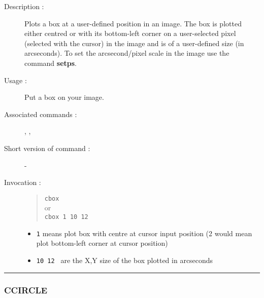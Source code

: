 \begin{description}

\item[Description :] Plots a box at a user-defined position in an image.  The
box is plotted either centred or with its bottom-left corner on a user-selected
pixel (selected with the cursor) in the image and is of a user-defined
size (in arcseconds).  To set the arcsecond/pixel scale in the image
use the command {\bf setps}.

\item[Usage :] Put a box on your image.
\item[Associated commands :] {\tt {}},
{\tt {}}, {\tt {}}
\item[Short version of command :] -
\item[Invocation :]

\begin{quote}{\tt  cbox }\\
or \\
{\tt cbox 1 10 12 }
\end{quote}

\begin{itemize}

\item {\tt 1} means plot box with centre at cursor input position
(2 would mean plot bottom-left corner at cursor position)
\item {\tt 10 12 } are the X,Y size of the box plotted in arcseconds

\end{itemize}

\end{description}

\hrule
\subsubsection*{\label{CCIRCLE}CCIRCLE}

